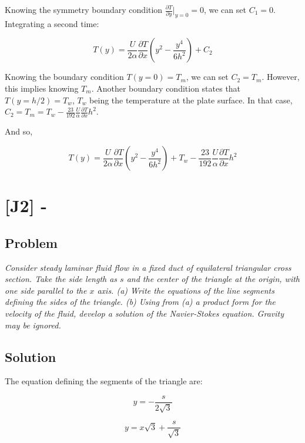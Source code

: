 Knowing the symmetry boundary condition $\frac{\partial T}{\partial y}\bigg\rvert_{y = 0} = 0$, we can set $C_1 = 0$. Integrating a second time:


\begin{equation}
T(y) = \frac{U}{2\alpha} \frac{\partial T}{\partial x} \left( y^2 - \frac{y^4}{6h^2} \right) + C_2
\end{equation}

Knowing the boundary condition $T(y = 0) = T_m$, we can set $C_2 = T_m$. However, this implies knowing $T_m$. Another boundary condition states that $T(y = h/2) = T_w$, $T_w$ being the temperature at the plate surface. In that case, $C_2 = T_m = T_w - \frac{23}{192}\frac{U}{\alpha}\frac{\partial T}{\partial x} h^2$.

And so,


\begin{equation}
T(y) = \frac{U}{2\alpha} \frac{\partial T}{\partial x} \left( y^2 - \frac{y^4}{6h^2} \right) + T_w - \frac{23}{192}\frac{U}{\alpha}\frac{\partial T}{\partial x} h^2
\end{equation}


\section{[J2] - }
\label{prob94}


\subsection{Problem}
\textit{Consider steady laminar fluid flow in a fixed duct of equilateral triangular cross section. Take the side length as $s$ and the center of the triangle at the origin, with one side parallel to the $x$ axis. (a) Write the equations of the line segments defining the sides of the triangle. (b) Using from (a) a product form for the velocity of the fluid, develop a solution of the Navier-Stokes equation. Gravity may be ignored.}

\subsection{Solution}

The equation defining the segments of the triangle are:


\begin{equation}
y = -\frac{s}{2\sqrt{3}}
\end{equation}

\begin{equation}
y = x\sqrt{3} + \frac{s}{\sqrt{3}}
\end{equation}

